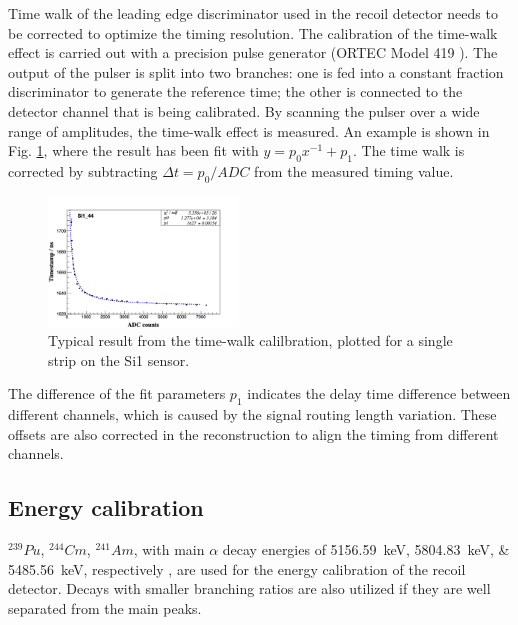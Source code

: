 \documentclass[number,5p]{elsarticle}
\begin{document}
Time walk of the leading edge discriminator used in the recoil detector needs to be corrected to optimize the timing resolution.
The calibration of the time-walk effect is carried out with a precision pulse generator (ORTEC Model 419 \cite{ortec}). 
The output of the pulser is split into two branches: one is fed into a constant fraction discriminator to generate the reference time;
the other is connected to the detector channel that is being calibrated. 
By scanning the pulser over a wide range of amplitudes, the time-walk effect is measured.
An example is shown in Fig. \ref{fig:timewalk}, where the result has been fit with \(y=p_0 x^{-1} + p_1\). 
The time walk is corrected by subtracting \(\Delta t = p_0/ADC\) from the measured timing value.
\begin{figure}[htbp]
  \centering
  \includegraphics[width=0.45\textwidth]{./timewalk.png}
  \caption{Typical result from the time-walk calilbration, plotted for a single
    strip on the Si1 sensor.}
  \label{fig:timewalk}
\end{figure}

The difference of the fit parameters \(p_1\) indicates the delay time
difference between different channels, which is caused by the signal routing length variation.
These offsets are also corrected in the reconstruction to align the timing from different channels.

\subsection{Energy calibration}
\label{sec:calibration}

\(^{239}Pu\), \(^{244}Cm\), \(^{241}Am\), with main $\alpha$ decay energies
of \SIlist{5156.59;5804.83;5485.56}{\keV}, respectively \cite{nuclear_data}, are
used for the energy calibration of the recoil detector.
Decays with smaller branching ratios are also utilized if they are well separated from the main peaks.
\end{document}
